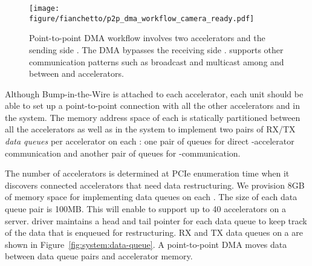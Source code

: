 \begin{figure}[t!]
    \centering
    \texttt{[image: figure/fianchetto/p2p\_dma\_workflow\_camera\_ready.pdf]}
    \caption[Point-to-point DMA workflow involves two accelerators and the sending side \drx.]{Point-to-point DMA workflow involves two accelerators and the sending side \drx. 
    The DMA bypasses the receiving side \drx.
    \dmx supports other communication patterns such as broadcast and multicast among \drxs and between \drxs and accelerators.
    }
    \label{fig:system:p2pdma}
\end{figure}

Although Bump-in-the-Wire \drx is attached to each accelerator, each \drx unit should be able to set up a point-to-point connection with all the other accelerators and \drxs in the system.
%
The memory address space of each \drx is statically partitioned between all the accelerators as well as \drxs in the system to implement two pairs of RX/TX \textit{data queues} per accelerator on each \drx: one pair of queues for direct \drx-accelerator communication and another pair of queues for \drx-\drx communication.
%

The number of accelerators is determined at PCIe enumeration time when it discovers connected accelerators that need data restructuring. We provision 8GB of memory space for implementing data queues on each \drx. The size of each data queue pair is 100MB. This will enable \dmx to support up to 40 accelerators on a server. 
%
\drx driver maintains a head and tail pointer for each data queue to keep track of the data that is enqueued for restructuring. 
%
RX and TX data queues on a \drx are shown in Figure~\ref{fig:system:data-queue}.
%
A point-to-point DMA moves data between data queue pairs and accelerator memory. %
%


